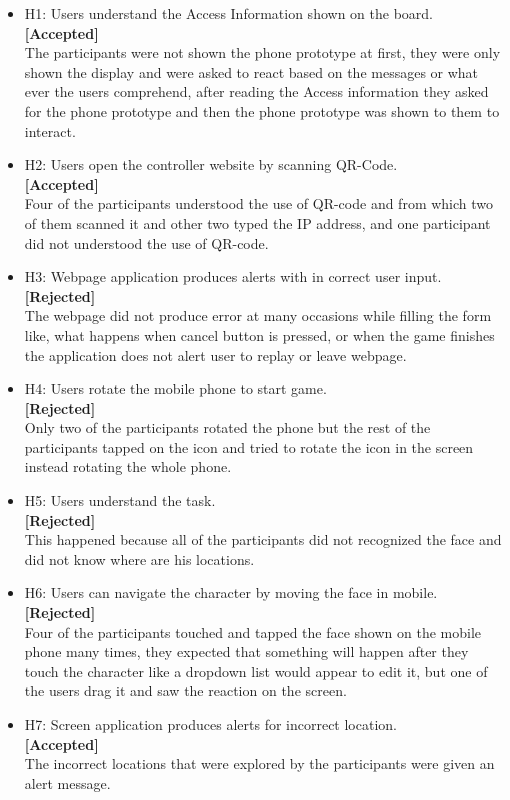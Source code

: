 \begin{itemize}
\item H1: Users understand the Access Information shown on the board. \\ 
\textbf{[Accepted]}\\
The participants were not shown the phone prototype at first, they were only shown the display and were asked to react based on the messages or what ever the users comprehend, after reading the Access information they asked for the phone prototype and then the phone prototype was shown to them to interact.

\item H2: Users open the controller website by scanning QR-Code. \\ 
\textbf{[Accepted]}\\
Four of the participants understood the use of QR-code and from which two of them scanned it and other two typed the IP address, and one participant did not understood the use of QR-code.

\item H3: Webpage application produces alerts with in correct user input.\\ 
\textbf{[Rejected]}\\
The webpage did not produce error at many occasions while filling the form like, what happens when cancel button is pressed, or when the game finishes the application does not alert user to replay or leave webpage.

\item H4: Users rotate the mobile phone to start game.\\ 
\textbf{[Rejected]}\\
Only two of the participants rotated the phone but the rest of the participants tapped on the icon and tried to rotate the icon in the screen instead rotating the whole phone.

\item H5: Users understand the task.\\ 
\textbf{[Rejected]}\\
This happened because all of the participants did not recognized the face and did not know where are his locations.

\item H6: Users can navigate the character by moving the face in mobile.\\ 
\textbf{[Rejected]}\\
Four of the participants touched and tapped the face shown on the mobile phone many times, they expected that something will happen after they touch the character like a dropdown list would appear to edit it, but one of the users drag it and saw the reaction on the screen.

\item H7: Screen application produces alerts for incorrect location.\\ 
\textbf{[Accepted]}\\
The incorrect locations that were explored by the participants were given an alert message.
\end{itemize}

